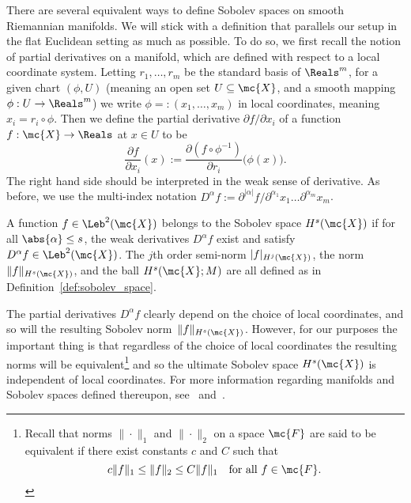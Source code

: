 There are several equivalent ways to define Sobolev spaces on smooth Riemannian manifolds. We will stick with a definition that parallels our setup in the flat Euclidean setting as much as possible. To do so, we first recall the notion of partial derivatives on a manifold, which are defined with respect to a local coordinate system. Letting $r_1,\ldots,r_m$ be the standard basis of $\Reals^m$, for a given chart $(\phi,U)$ (meaning an open set $U \subseteq \mc{X}$, and a smooth mapping $\phi: U \to \Reals^m$) we write $\phi =: (x_1,\ldots,x_m)$ in local coordinates, meaning $x_i = r_i \circ \phi$. Then we define the partial derivative $\partial f/\partial x_i$ of a function $f: \mc{X} \to \Reals$ at $x \in U$ to be
\begin{equation*}
\frac{\partial f}{\partial x_i}(x) := \frac{\partial(f \circ \phi^{-1})}{\partial r_i}\bigl(\phi(x)\bigr).
\end{equation*}
The right hand side should be interpreted in the weak sense of derivative. As before, we use the multi-index notation $D^{\alpha}f := \partial^{|\alpha|}f/\partial^{\alpha_1}x_1\ldots\partial^{\alpha_m}x_m$. 

\begin{definition}
	\label{def:sobolev_space_manifold}
	A function $f \in \Leb^2(\mc{X})$ belongs to the Sobolev space $H^{s}(\mc{X})$ if for all $\abs{\alpha} \leq s$, the weak derivatives $D^{\alpha}f$ exist and satisfy  $D^{\alpha}f \in \Leb^2(\mc{X})$. The $j$th order semi-norm $|f|_{H^j(\mc{X})}$, the norm $\|f\|_{H^s(\mc{X})}$, and the ball $H^s(\mc{X};M)$ are all defined as in Definition~\ref{def:sobolev_space}.
\end{definition}
The partial derivatives $D^{\alpha}f$ clearly depend on the choice of local coordinates, and so will the resulting Sobolev norm~$\|f\|_{H^s(\mc{X})}$. However, for our purposes the important thing is that regardless of the choice of local coordinates the resulting norms will be equivalent\footnote{Recall that norms $\|\cdot\|_1$ and $\|\cdot\|_2$ on a space $\mc{F}$ are said to be equivalent if there exist constants $c$ and $C$ such that
	\begin{equation*}
	c \|f\|_1 \leq \|f\|_2 \leq C \|f\|_1 \quad \textrm{for all $f \in \mc{F}$.}
	\end{equation*}} 
and so the ultimate Sobolev space $H^s(\mc{X})$ is independent of local coordinates. For more information regarding manifolds and Sobolev spaces defined thereupon, see~\cite{lee2013} and~\cite{hebey1996}.

